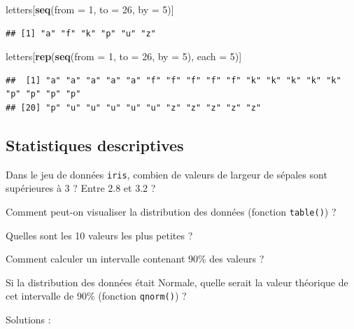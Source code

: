 \documentclass[
]{book}
\newenvironment{Shaded}{\begin{snugshade}}{\end{snugshade}}
\newcommand{\DataTypeTok}[1]{\textcolor[rgb]{0.13,0.29,0.53}{#1}}
\newcommand{\DecValTok}[1]{\textcolor[rgb]{0.00,0.00,0.81}{#1}}
\newcommand{\KeywordTok}[1]{\textcolor[rgb]{0.13,0.29,0.53}{\textbf{#1}}}
\newcommand{\NormalTok}[1]{#1}
\newcommand{\OperatorTok}[1]{\textcolor[rgb]{0.81,0.36,0.00}{\textbf{#1}}}
\newcommand{\StringTok}[1]{\textcolor[rgb]{0.31,0.60,0.02}{#1}}
\begin{document}
\begin{Shaded}
\begin{Highlighting}[]
\NormalTok{letters[}\KeywordTok{seq}\NormalTok{(}\DataTypeTok{from =} \DecValTok{1}\NormalTok{, }\DataTypeTok{to =} \DecValTok{26}\NormalTok{, }\DataTypeTok{by =} \DecValTok{5}\NormalTok{)]}
\end{Highlighting}
\end{Shaded}

\begin{verbatim}
## [1] "a" "f" "k" "p" "u" "z"
\end{verbatim}

\begin{Shaded}
\begin{Highlighting}[]
\NormalTok{letters[}\KeywordTok{rep}\NormalTok{(}\KeywordTok{seq}\NormalTok{(}\DataTypeTok{from =} \DecValTok{1}\NormalTok{, }\DataTypeTok{to =} \DecValTok{26}\NormalTok{, }\DataTypeTok{by =} \DecValTok{5}\NormalTok{), }\DataTypeTok{each =} \DecValTok{5}\NormalTok{)]}
\end{Highlighting}
\end{Shaded}

\begin{verbatim}
##  [1] "a" "a" "a" "a" "a" "f" "f" "f" "f" "f" "k" "k" "k" "k" "k" "p" "p" "p" "p"
## [20] "p" "u" "u" "u" "u" "u" "z" "z" "z" "z" "z"
\end{verbatim}

\hypertarget{statistiques-descriptives-1}{%
\subsection{Statistiques descriptives}\label{statistiques-descriptives-1}}

Dans le jeu de données \texttt{iris}, combien de valeurs de largeur de sépales sont supérieures à 3 ? Entre 2.8 et 3.2 ?

Comment peut-on visualiser la distribution des données (fonction \texttt{table()}) ?

Quelles sont les 10 valeurs les plus petites ?

Comment calculer un intervalle contenant 90\% des valeurs ?

Si la distribution des données était Normale, quelle serait la valeur théorique de cet intervalle de 90\% (fonction \texttt{qnorm()}) ?

Solutions :

\begin{Shaded}
\end{Shaded}
\end{document}
